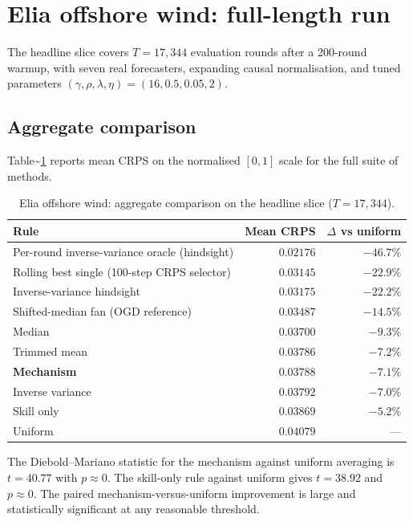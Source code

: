 \documentclass[
  11pt,
  a4paper,
  oneside]{report}
\begin{document}
\section{Elia offshore wind: full-length
run}\label{elia-offshore-wind-full-length-run}

The headline slice covers \(T = 17{,}344\) evaluation rounds after a
200-round warmup, with seven real forecasters, expanding causal
normalisation, and tuned parameters
\((\gamma, \rho, \lambda, \eta) = (16, 0.5, 0.05, 2)\).

\subsection{Aggregate comparison}\label{aggregate-comparison}

Table\textasciitilde{}\ref{tab:wind-headline} reports mean CRPS on the
normalised \([0, 1]\) scale for the full suite of methods.

\begin{table}[h]
\centering
\small
\begin{tabular}{lrr}
\toprule
Rule & Mean CRPS & $\Delta$ vs uniform \\
\midrule
Per-round inverse-variance oracle (hindsight)
  & $0.02176$ & $-46.7\%$ \\
Rolling best single (100-step CRPS selector)
  & $0.03145$ & $-22.9\%$ \\
Inverse-variance hindsight & $0.03175$ & $-22.2\%$ \\
Shifted-median fan (OGD reference)
  & $0.03487$ & $-14.5\%$ \\
Median & $0.03700$ & $-9.3\%$ \\
Trimmed mean & $0.03786$ & $-7.2\%$ \\
\textbf{Mechanism} & $\mathbf{0.03788}$ & $\mathbf{-7.1\%}$ \\
Inverse variance & $0.03792$ & $-7.0\%$ \\
Skill only & $0.03869$ & $-5.2\%$ \\
Uniform & $0.04079$ & --- \\
\bottomrule
\end{tabular}
\caption{Elia offshore wind: aggregate comparison on the headline
slice ($T = 17{,}344$).}
\label{tab:wind-headline}
\end{table}

The Diebold--Mariano statistic for the mechanism against uniform
averaging is \(t = 40.77\) with \(p \approx 0\). The skill-only rule
against uniform gives \(t = 38.92\) and \(p \approx 0\). The paired
mechanism-versus-uniform improvement is large and statistically
significant at any reasonable threshold.
\end{document}
